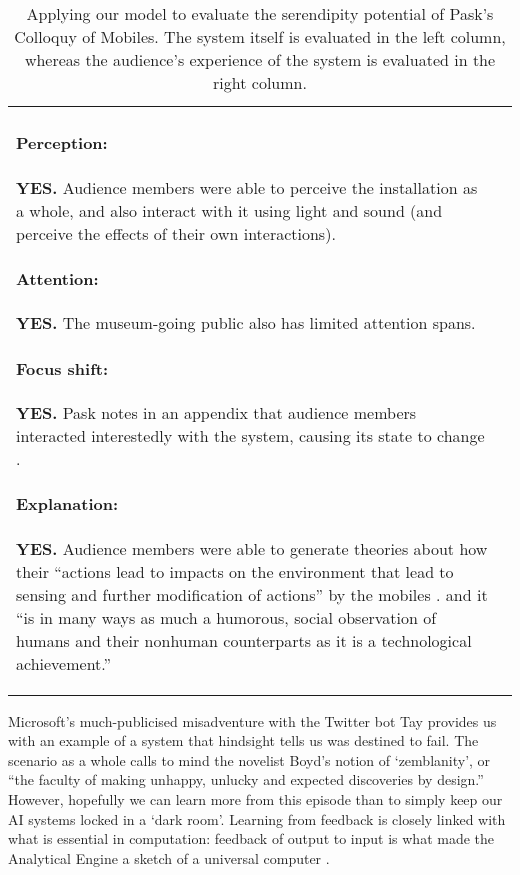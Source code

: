\begin{table}
\begin{mdframed}
\begin{tabular}{@{\hspace{-0.01\textwidth}}p{}@{\hspace{.02\textwidth}}p{}}
\begin{minipage}{.48\textwidth}
\paragraph{Perception:} \textbf{YES.}
Audience members were able to perceive the installation as a whole,
and also interact with it using light and sound (and perceive the
effects of their own interactions). 
\paragraph{Attention:} \textbf{YES.}
The museum-going public also has limited attention spans.
\paragraph{Focus shift:} \textbf{YES.}
Pask notes in an appendix 
that audience members interacted interestedly with the system, causing its state to change \cite[p.~98]{pask1971comment}.
\paragraph{Explanation:} \textbf{YES.}
Audience members were able to generate theories about how
their ``actions lead to impacts on the environment that lead to sensing and further modification of actions'' by the mobiles
\cite{haque2007architectural}.
 and it ``is
in many ways as much a humorous, social observation of humans and
their nonhuman counterparts as it is a technological achievement.''
\end{minipage}
\end{tabular}
\end{mdframed}
\caption{Applying our model to evaluate the serendipity potential of Pask's {\sf Colloquy of Mobiles}.  The system itself is evaluated in the left column, whereas the audience's experience of the system is evaluated in the right column. \label{ex:mobiles}}
\end{table}


Microsoft's
much-publicised misadventure with the Twitter bot {\sf Tay}
\cite{wolf2017we} provides us with an example of a system that
hindsight tells us was destined to fail.  The scenario as a whole
calls to mind the novelist Boyd's \cite[p.~211]{boyd2010armadillo}
notion of `zemblanity', or ``the faculty of making unhappy, unlucky
and expected discoveries by design.''  However, hopefully we can learn
more from this episode than to simply keep our AI systems locked in a
`dark room'.
Learning from feedback is closely linked with what is essential in
computation: feedback of output to input is what made the Analytical
Engine a sketch of a universal computer \cite[p.~24]{Webb1980}.

